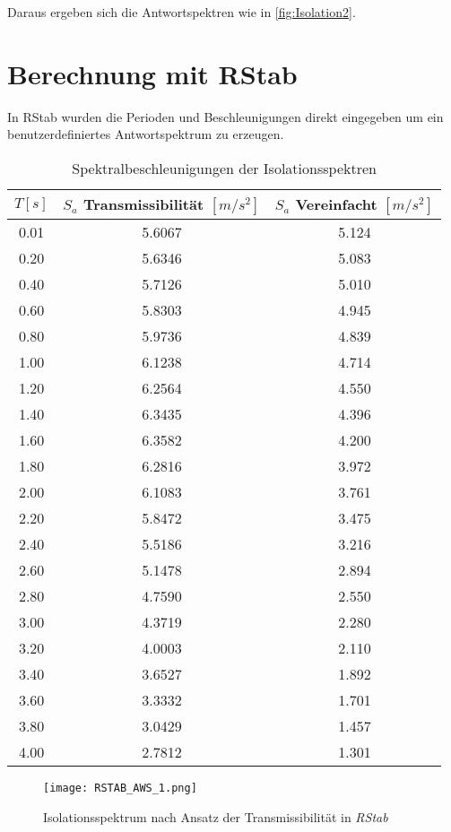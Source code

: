 Daraus ergeben sich die Antwortspektren wie in \cref{fig:Isolation2}.

\pagebreak

\section{Berechnung mit RStab}
\label{sec:rstab}

In RStab wurden die Perioden und Beschleunigungen direkt eingegeben um ein benutzerdefiniertes Antwortspektrum zu erzeugen.

\begin{table}[H]
\centering
\begin{tabular}{ |c|c|c| } 
 \hline
 $T [s]$ & $S_a$ Transmissibilität $[m/s^2]$ & $S_a$ Vereinfacht $[m/s^2]$\\
 \hline\hline
0.01 & 5.6067 & 5.124\\
0.20 & 5.6346 & 5.083\\
0.40 & 5.7126 & 5.010\\
0.60 & 5.8303 & 4.945\\
0.80 & 5.9736 & 4.839\\
1.00 & 6.1238 & 4.714\\
1.20 & 6.2564 & 4.550\\
1.40 & 6.3435 & 4.396\\
1.60 & 6.3582 & 4.200\\
1.80 & 6.2816 & 3.972\\
2.00 & 6.1083 & 3.761\\
2.20 & 5.8472 & 3.475\\
2.40 & 5.5186 & 3.216\\
2.60 & 5.1478 & 2.894\\
2.80 & 4.7590 & 2.550\\
3.00 & 4.3719 & 2.280\\
3.20 & 4.0003 & 2.110\\
3.40 & 3.6527 & 1.892\\
3.60 & 3.3332 & 1.701\\
3.80 & 3.0429 & 1.457\\
4.00 & 2.7812 & 1.301\\
 \hline
\end{tabular}
\caption{Spektralbeschleunigungen der Isolationsspektren}
\end{table}

\begin{figure}[H]
    \centering
    \texttt{[image: RSTAB\_AWS\_1.png]}
    \caption{Isolationsspektrum nach Ansatz der Transmissibilität in \emph{RStab}}
\end{figure}

